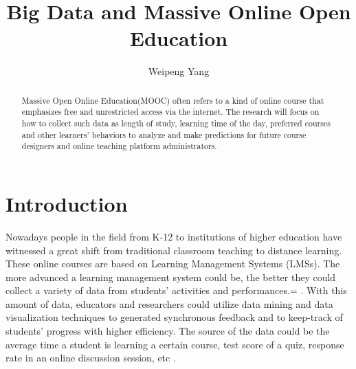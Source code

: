 \documentclass[sigconf]{acmart}
\begin{document}
\title{Big Data and Massive Online Open Education}

\author{Weipeng Yang}



\begin{abstract}
Massive Open Online Education(MOOC) often refers to a kind of online course that emphasizes free and unrestricted access via the internet. The research will focus on how to collect such data as length of study, learning time of the day, preferred courses and other learners' behaviors to analyze and make predictions for future course designers and online teaching platform administrators.
\end{abstract}


\maketitle

\section{Introduction}

Nowadays people in the field from K-12 to institutions of higher education have witnessed a great shift from traditional classroom teaching to distance learning. These online courses are based on Learning Management Systems (LMSs). The more advanced a learning management system could be, the better they could collect a variety of data from students' activities and performances.= \cite{Cormier2010}. With this amount of data, educators and researchers could utilize data mining and data visualization techniques to generated synchronous feedback and to keep-track of students' progress with higher efficiency. The source of the data could be the average time a student is learning a certain course, test score of a quiz, response rate in an online discussion session, etc \cite{Klobas2010}.
\end{document}
